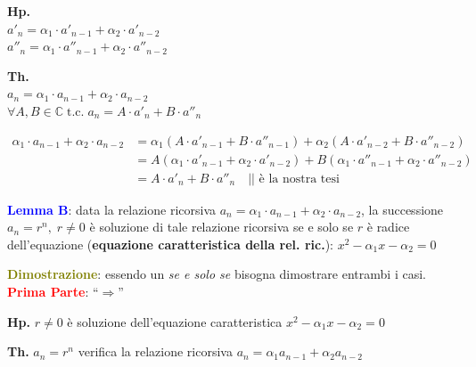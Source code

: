 \begin{flushleft}
\begin{boxA}
        {\centering
            \begin{minipage}[t]{0.45\textwidth}
                \centering
                \textbf{Hp.} \\
                $a'_n = \alpha_1 \cdot a'_{n-1} + \alpha_2 \cdot a'_{n-2}$ \\
                $a''_n= \alpha_1 \cdot a''_{n-1} + \alpha_2 \cdot a''_{n-2}$
            \end{minipage}
            \hfill
            \begin{minipage}[t]{0.45\textwidth}
                \centering
                \textbf{Th.} \\
                $a_n = \alpha_1 \cdot a_{n-1} + \alpha_2 \cdot a_{n-2}$ \\
                $\forall A, B \in \mathbb{C} \; \text{t.c.} \; a_n = A \cdot a'_n + B \cdot a''_n$
            \end{minipage}
        \par}
        \begin{align*}
            \alpha_1 \cdot a_{n-1} + \alpha_2 \cdot a_{n-2} &= \alpha_1(A \cdot a'_{n-1} + B \cdot a''_{n-1}) + \alpha_2(A \cdot a'_{n-2} + B \cdot a''_{n-2}) \\
            &= A(\alpha_1 \cdot a'_{n-1} + \alpha_2 \cdot a'_{n-2}) + B (\alpha_1 \cdot a''_{n-1} + \alpha_2 \cdot a''_{n-2}) \\
            &= A \cdot a'_n + B \cdot a''_n \quad \text{|| è la nostra tesi}
        \end{align*}
    \end{boxA}
    \textcolor{blue}{\textbf{Lemma B}}: data la relazione ricorsiva $a_n = \alpha_1 \cdot a_{n-1} + \alpha_2 \cdot a_{n-2}$, la successione $a_n = r^n, \; r \neq 0$ è soluzione di tale relazione ricorsiva se e solo se $r$ è radice dell'equazione (\textbf{equazione caratteristica della rel. ric.}): $x^2 - \alpha_1 x - \alpha_2 = 0$
    \begin{boxA}
        \textcolor{olive}{\textbf{Dimostrazione}}: essendo un \textit{se e solo se} bisogna dimostrare entrambi i casi. \newline
        \textcolor{red}{\textbf{Prima Parte}}: ``$\Rightarrow$'' 

        {\centering
            \begin{minipage}[t]{0.45\textwidth}
                \centering
                \textbf{Hp.} $r \neq 0$ è soluzione dell'equazione caratteristica $x^2 - \alpha_1 x - \alpha_2 = 0$ \\
            \end{minipage}
            \hfill
            \begin{minipage}[t]{0.45\textwidth}
                \centering
                \textbf{Th.} $a_n = r^n$ verifica la relazione ricorsiva $a_n = \alpha_1a_{n-1} + \alpha_2a_{n-2}$ \\
            \end{minipage}
        \par}
        

\end{boxA}
\end{flushleft}
